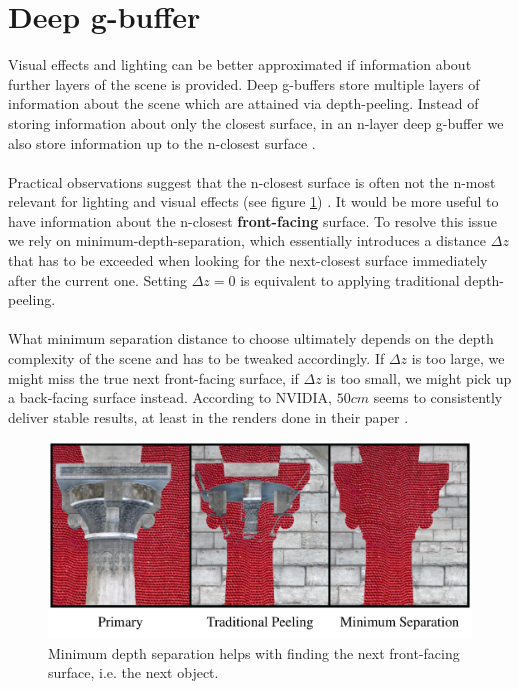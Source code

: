 \documentclass{ACGSeminar}
\begin{document}
\section{Deep g-buffer}%
	Visual effects and lighting can be better approximated if information about further layers of the scene is provided. Deep g-buffers store multiple layers of information about the scene which are attained via depth-peeling. Instead of storing information about only the closest surface, in an n-layer deep g-buffer we also store information up to the n-closest surface \cite{Mara2016DeepGBuffer}. \\\\
	Practical observations suggest that the n-closest surface is often not the n-most relevant for lighting and visual effects (see figure \ref{fig:minimum_depth_separation}) \cite{Mara2016DeepGBuffer}. It would be more useful to have information about the n-closest \textbf{front-facing} surface. To resolve this issue we rely on minimum-depth-separation, which essentially introduces a distance $\Delta z$ that has to be exceeded when looking for the next-closest surface immediately after the current one. Setting $\Delta z = 0$ is equivalent to applying traditional depth-peeling. \\\\
	What minimum separation distance to choose ultimately depends on the depth complexity of the scene and has to be tweaked accordingly. If $\Delta z$ is too large, we might miss the true next front-facing surface, if $\Delta z$ is too small, we might pick up a back-facing surface instead. According to NVIDIA, $50cm$ seems to consistently deliver stable results, at least in the renders done in their paper \cite{Mara2016DeepGBuffer}.
	\begin{figure}[htb!]%
		\begin{center}
			\includegraphics[width=.534567\textwidth]{img/minimum_depth_separation.png}
			\caption{Minimum depth separation helps with finding the next front-facing surface, i.e. the next object.}%
			\label{fig:minimum_depth_separation}%
		\end{center}
	\end{figure}%
\end{document}
